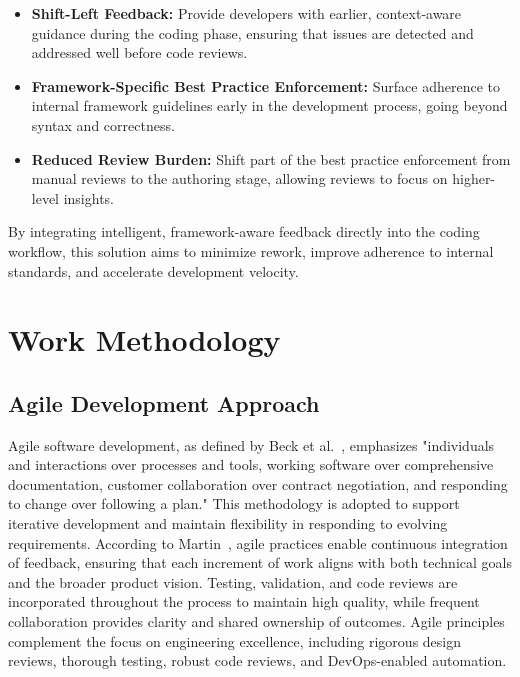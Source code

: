 \begin{spacing}{1.2}
\begin{itemize}
    \item \textbf{Shift-Left Feedback:} Provide developers with earlier, context-aware guidance during the coding phase, ensuring that issues are detected and addressed well before code reviews.  
    \item \textbf{Framework-Specific Best Practice Enforcement:} Surface adherence to internal framework guidelines early in the development process, going beyond syntax and correctness.  
    \item \textbf{Reduced Review Burden:} Shift part of the best practice enforcement from manual reviews to the authoring stage, allowing reviews to focus on higher-level insights.  
\end{itemize}

By integrating intelligent, framework-aware feedback directly into the coding workflow, this solution aims to minimize rework, improve adherence to internal standards, and accelerate development velocity.  

\section{Work Methodology}

\subsection{Agile Development Approach}
Agile software development, as defined by Beck et al.~\cite{beck2001agile}, emphasizes "individuals and interactions over processes and tools, working software over comprehensive documentation, customer collaboration over contract negotiation, and responding to change over following a plan." This methodology is adopted to support iterative development and maintain flexibility in responding to evolving requirements. According to Martin~\cite{martin2003agile}, agile practices enable continuous integration of feedback, ensuring that each increment of work aligns with both technical goals and the broader product vision. Testing, validation, and code reviews are incorporated throughout the process to maintain high quality, while frequent collaboration provides clarity and shared ownership of outcomes. Agile principles complement the focus on engineering excellence, including rigorous design reviews, thorough testing, robust code reviews, and DevOps-enabled automation.


\end{spacing}
